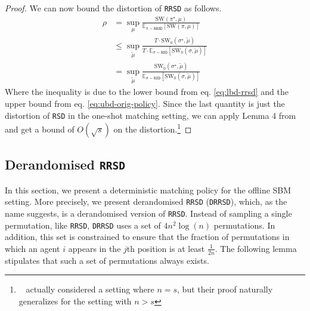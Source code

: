 \documentclass[letterpaper,11pt]{article}
\newcommand{\citet}[1]{\citeauthor*{#1}~\cite{#1}}
\newcommand{\kibitz}[2]{\ifnum\Comments=1{\color{#1}{#2}}\fi}
\newcommand{\dm}[1]{\kibitz{ForestGreen}{[Deb: #1]}}
\newcommand{\SW}{\textrm{SW}}
\begin{document}
\begin{proof}
      
    
    We can now bound the distortion of \texttt{RRSD} as follows.
    \begin{align*}
        \rho &= \sup_\mu \frac{\textrm{SW}(\pi^\star, \mu)}{\mathbb{E}_{\pi \sim \texttt{RRSD}}[\textrm{SW}(\pi, \mu)]} \\&\le \sup_{\tilde{\mu}} \frac{T \cdot \textrm{SW}_0(\sigma^\star, \tilde{\mu})}{T\cdot \mathbb{E}_{\sigma \sim \texttt{RSD}}[\textrm{SW}_0(\sigma, \tilde{\mu})]} \\&= \sup_{\tilde{\mu}} \frac{\textrm{SW}_0(\sigma^\star, \tilde{\mu})}{\mathbb{E}_{\sigma \sim \texttt{RSD}}[\textrm{SW}_0(\sigma, \tilde{\mu})]} 
    \end{align*}
    Where the inequality is due to the lower bound from  eq. \ref{eq:lbd-rrsd} and the upper bound from eq. \ref{eq:ubd-orig-policy}.
    Since the last quantity is just the distortion of \texttt{RSD} in the one-shot matching setting, we can apply Lemma 4 from \cite{FFKZ14} and get a bound of $O(\sqrt{s})$ on the distortion.\footnote{\citet{FFKZ14} actually considered a setting where $n=s$, but their proof naturally generalizes for the setting with $n > s$}
\end{proof}


\subsection{Derandomised \texttt{RRSD}}
In this section, we present a deterministic matching policy for the offline SBM setting. More precisely, we present derandomised \texttt{RRSD} (\texttt{DRRSD}), which, as the name suggests, is a derandomised version of \texttt{RRSD}. Instead of sampling a single permutation, like \texttt{RRSD}, \texttt{DRRSD} uses a set of $4n^{2}\log(n)$ permutations. In addition, this set is constrained to ensure that the fraction of permutations in which an agent $i$ appears in the $j$th position is at least $\frac{1}{2n}$. The following lemma stipulates that such a set of permutations always exists.
\end{document}
